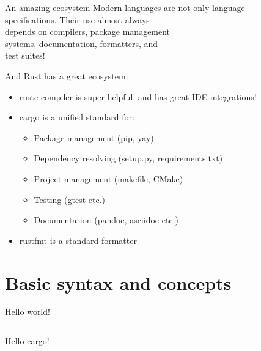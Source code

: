 \documentclass[usenames,dvipsnames,10pt,aspectratio=169]{beamer}
\begin{document}
\begin{frame}{An amazing ecosystem} 
Modern languages are not only language\\
specifications. Their use almost always\\
depends on compilers, package management\\
systems, documentation, formatters, and\\
test suites!
\vspace{0.25cm}

\large
And Rust has a great ecosystem:
\begin{itemize}
	\item rustc compiler is super helpful, and has great IDE integrations!
	\item cargo is a unified standard for:
		\begin{itemize}
			\item Package management (pip, yay)
			\item Dependency resolving (setup.py, requirements.txt)
			\item Project management (makefile, CMake)
			\item Testing (gtest etc.)
			\item Documentation (pandoc, asciidoc etc.)
		\end{itemize}
	\item rustfmt is a standard formatter
\end{itemize}
\end{frame}


\section{Basic syntax and concepts}

\begin{frame}{Hello world!}

	\inputminted[fontsize=\Large]{c}{code/helloworld.rs}

\end{frame}

\begin{frame}{Hello cargo!}

	\inputminted[fontsize=\Large]{c}{code/hellocargo.rs}

\end{frame}

\end{document}
